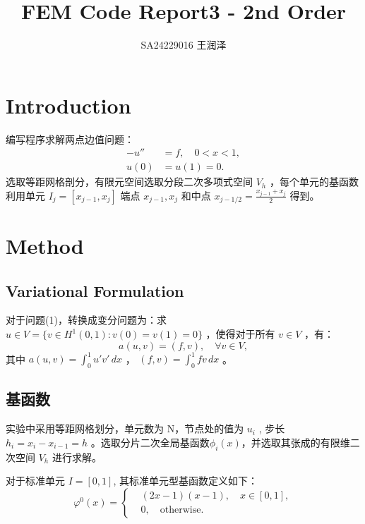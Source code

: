 \documentclass[11pt]{ctexart}
\title{FEM Code Report3 - 2nd Order}
\author{SA24229016 王润泽}
\begin{document}
\maketitle

\section{Introduction}
编写程序求解两点边值问题：
\begin{equation}
     \begin{aligned}
          -u'' &= f, \quad 0 < x < 1, \\
          u(0) &= u(1) = 0.
     \end{aligned}
\end{equation}
选取等距网格剖分，有限元空间选取分段二次多项式空间 $ V_h $ ，每个单元的基函数利用单元 $ I_j = [x_{j-1},x_j] $ 端点 $ x_{j-1}, x_j $ 和中点 $ x_{j-1/2} =  \frac{x_{j-1} + x_j}{2} $ 得到。

\section{Method}
\subsection{Variational Formulation}
对于问题(1)，转换成变分问题为：求 $ u \in V= \{ v \in H^1(0,1) : v(0) = v(1) = 0 \} $ ，使得对于所有 $ v \in V $ ，有：
\begin{equation}
     a(u,v) = (f,v), \quad \forall v \in V,
\end{equation}
其中 $ a(u,v) = \int_0^1 u'v' \, dx $ ， $ (f,v) = \int_0^1 fv \, dx $ 。

\subsection{基函数}
实验中采用等距网格划分，单元数为 N，节点处的值为 $ u_i$ , 步长$h_i = x_{i}-x_{i-1}=h$ 。选取分片二次全局基函数$ \phi_i(x) $，并选取其张成的有限维二次空间 $ V_h $ 进行求解。

对于标准单元 $ I = [0,1] $, 其标准单元型基函数定义如下：
\begin{equation}
     \varphi^0(x) = \left\{
     \begin{aligned}
          &(2x-1)(x-1) , \quad x \in [0,1], \\
          &0, \quad \text{otherwise}.
     \end{aligned}
     \right.
\end{equation}
\end{document}
